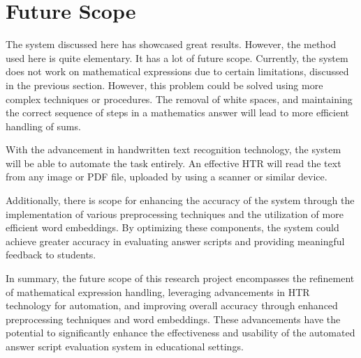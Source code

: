 \section{Future Scope}
\par
The system discussed here has showcased great results. However, the method used here is quite elementary. It has a lot of future scope. Currently, the system does not work on mathematical expressions due to certain limitations, discussed in the previous section. However, this problem could be solved using more complex techniques or procedures. The removal of white spaces, and maintaining the correct sequence of steps in a mathematics answer will lead to more efficient handling of sums.  \\
\par
With the advancement in handwritten text recognition technology, the system will be able to automate the task entirely. An effective HTR will read the text from any image or PDF file, uploaded by using a scanner or similar device.  \\
\par 
Additionally, there is scope for enhancing the accuracy of the system through the implementation of various preprocessing techniques and the utilization of more efficient word embeddings. By optimizing these components, the system could achieve greater accuracy in evaluating answer scripts and providing meaningful feedback to students.   \\
\par 
In summary, the future scope of this research project encompasses the refinement of mathematical expression handling, leveraging advancements in HTR technology for automation, and improving overall accuracy through enhanced preprocessing techniques and word embeddings. These advancements have the potential to significantly enhance the effectiveness and usability of the automated answer script evaluation system in educational settings.

